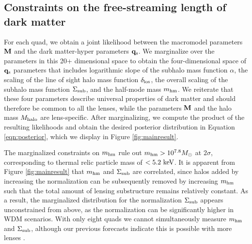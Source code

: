 \subsection{Constraints on the free-streaming length of dark matter}
\label{ssec:mainresults}
For each quad, we obtain a joint likelihood between the macromodel parameters ${\bf{M}}$ and the dark matter-hyper parameters ${\bf{q}_{\rm{s}}}$. We marginalize over the parameters in this 20+ dimensional space to obtain the four-dimensional space of ${\bf{q}_{\rm{s}}}$ parameters that includes logarithmic slope of the subhalo mass function $\alpha$, the scaling of the line of sight halo mass function $\delta_{\rm{los}}$, the overall scaling of the subhalo mass function $\Sigma_{\rm{sub}}$, and the half-mode mass ${m_{\rm{hm}}}$. We reiterate that these four parameters describe universal properties of dark matter and should therefore be common to all the lenses, while the parameters ${\bf{M}}$ and the halo mass $M_{\rm{halo}}$ are lens-specific. After marginalizing, we compute the product of the resulting likelihoods and obtain the desired posterior distribution in Equation \ref{eqn:posterior}, which we display in Figure \ref{fig:mainresult}.

The marginalized constraints on ${m_{\rm{hm}}}$ rule out ${m_{\rm{hm}}} > 10^{7.8} {M_{\odot}}$ at $2 \sigma$, corresponding to thermal relic particle mass of $<5.2 \ \rm{keV}$. It is apparent from Figure \ref{fig:mainresult} that ${m_{\rm{hm}}}$ and $\Sigma_{\rm{sub}}$ are correlated, since halos added by increasing the normalization can be subsequently removed by increasing ${m_{\rm{hm}}}$ such that the total amount of lensing substructure remains relatively constant. As a result, the marginalized distribution for the normalization $\Sigma_{\rm{sub}}$ appears unconstrained from above, as the normalization can be significantly higher in WDM scenarios. With only eight quads we cannot simultaneously measure ${m_{\rm{hm}}}$ and $\Sigma_{\rm{sub}}$, although our previous forecasts indicate this is possible with more lenses \cite{Gilman++18}. 

